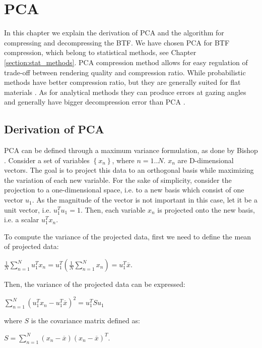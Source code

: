 \chapter{PCA}
\label{section:pca}


In this chapter we explain the derivation of PCA and the algorithm for compressing and decompressing the BTF.
We have chosen PCA for BTF compression, which belong to statistical methods, see Chapter \ref{section:stat_methods}.
PCA compression method allows for easy regulation of trade-off between rendering quality and compression ratio.
While probabilistic methods have better compression ratio, but they are generally suited for flat materials \cite{haindl}.
As for analytical methods they can produce errors at gazing angles and generally have bigger decompression error than PCA \cite{haindl}.


 \section{Derivation of PCA}
\label{section:derivation_pca}

 PCA can be defined through a maximum variance formulation, as done by Bishop \cite{Bishop}.
 Consider a set of variables $\left \{ x_{n} \right \}$, where $n=1..N$. $x_{n}$ are D-dimensional vectors. The goal is to project this data to an orthogonal basis while maximizing the variation of each new variable.
For the sake of simplicity, consider the projection to a one-dimensional space, i.e. to a new basis which consist of one vector $u_{1}$. 
As the magnitude of the vector is not important in this case, let it be a unit vector, i.e. $u_{1}^Tu_{1}=1$.
 Then, each variable $x_{n}$ is projected onto the new basis, i.e. a scalar $u_{1}^Tx_{n}$.

 To compute the variance of the projected data, first we need to define the mean of projected data:

{\centering$\tfrac{1}{N}\sum_{n=1}^{N}u_{1}^Tx_{n}=u_{1}^T(\tfrac{1}{N}\sum_{n=1}^{N}x_{n})=u_{1}^T\overline{x}.$\\}

Then, the variance of the projected data can be expressed:

{\centering$\sum_{n=1}^{N}(u_{1}^Tx_{n}-u_{1}^T\overline{x} )^2=u_{1}^TSu_{1}$\\}

where $S$ is the covariance matrix defined as:

{\centering$S=\sum_{n=1}^{N}(x_{n}-\overline{x})(x_{n}-\overline{x})^T.$\\}

